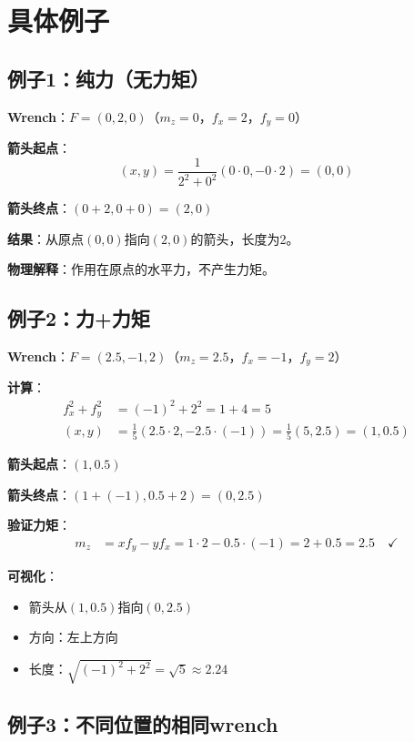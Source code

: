 \documentclass[12pt,a4paper]{article}
\begin{document}
\section{具体例子}

\subsection{例子1：纯力（无力矩）}

\textbf{Wrench}：$F = (0, 2, 0)$（$m_z = 0$，$f_x = 2$，$f_y = 0$）

\textbf{箭头起点}：
\begin{equation}
(x, y) = \frac{1}{2^2 + 0^2} (0 \cdot 0, -0 \cdot 2) = (0, 0)
\end{equation}

\textbf{箭头终点}：$(0 + 2, 0 + 0) = (2, 0)$

\textbf{结果}：从原点$(0,0)$指向$(2,0)$的箭头，长度为2。

\textbf{物理解释}：作用在原点的水平力，不产生力矩。

\subsection{例子2：力+力矩}

\textbf{Wrench}：$F = (2.5, -1, 2)$（$m_z = 2.5$，$f_x = -1$，$f_y = 2$）

\textbf{计算}：
\begin{align}
f_x^2 + f_y^2 &= (-1)^2 + 2^2 = 1 + 4 = 5 \\
(x, y) &= \frac{1}{5} (2.5 \cdot 2, -2.5 \cdot (-1)) = \frac{1}{5} (5, 2.5) = (1, 0.5)
\end{align}

\textbf{箭头起点}：$(1, 0.5)$

\textbf{箭头终点}：$(1 + (-1), 0.5 + 2) = (0, 2.5)$

\textbf{验证力矩}：
\begin{align}
m_z &= x f_y - y f_x = 1 \cdot 2 - 0.5 \cdot (-1) = 2 + 0.5 = 2.5 \quad \checkmark
\end{align}

\textbf{可视化}：
\begin{itemize}
\item 箭头从$(1, 0.5)$指向$(0, 2.5)$
\item 方向：左上方向
\item 长度：$\sqrt{(-1)^2 + 2^2} = \sqrt{5} \approx 2.24$
\end{itemize}

\subsection{例子3：不同位置的相同wrench}
\end{document}
